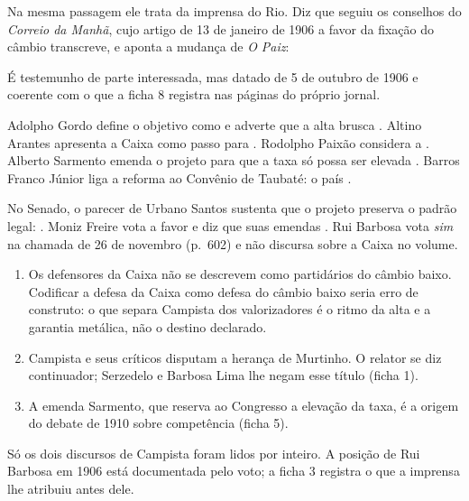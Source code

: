 
Na mesma passagem ele trata da imprensa do Rio. Diz que seguiu os conselhos
do \textit{Correio da Manhã}, cujo artigo de 13 de janeiro de 1906 a favor da
fixação do câmbio transcreve, e aponta a mudança de \textit{O Paiz}:



É testemunho de parte interessada, mas datado de 5 de outubro de 1906 e
coerente com o que a ficha 8 registra nas páginas do próprio jornal.


Adolpho Gordo define o objetivo como   e adverte que a alta
brusca  . Altino Arantes
apresenta a Caixa como passo para  . Rodolpho Paixão considera a
. Alberto Sarmento emenda o projeto para que a taxa só possa ser
elevada  . Barros Franco Júnior
liga a reforma ao Convênio de Taubaté: o país  .

No Senado, o parecer de Urbano Santos sustenta que o projeto preserva o padrão
legal: 
. Moniz Freire vota a favor e diz que suas emendas
 . Rui Barbosa vota
\textit{sim} na chamada de 26 de novembro (p.~602) e não discursa sobre a
Caixa no volume.


\begin{enumerate}[leftmargin=*,nosep]
\item Os defensores da Caixa não se descrevem como partidários do câmbio baixo.
Codificar a defesa da Caixa como defesa do câmbio baixo seria erro de
construto: o que separa Campista dos valorizadores é o ritmo da alta e a
garantia metálica, não o destino declarado.
\item Campista e seus críticos disputam a herança de Murtinho. O relator se diz
continuador; Serzedelo e Barbosa Lima lhe negam esse título (ficha 1).
\item A emenda Sarmento, que reserva ao Congresso a elevação da taxa, é a
origem do debate de 1910 sobre competência (ficha 5).
\end{enumerate}


Só os dois discursos de Campista foram lidos por inteiro. A posição de Rui
Barbosa em 1906 está documentada pelo voto; a ficha 3 registra o que a imprensa
lhe atribuiu antes dele.
